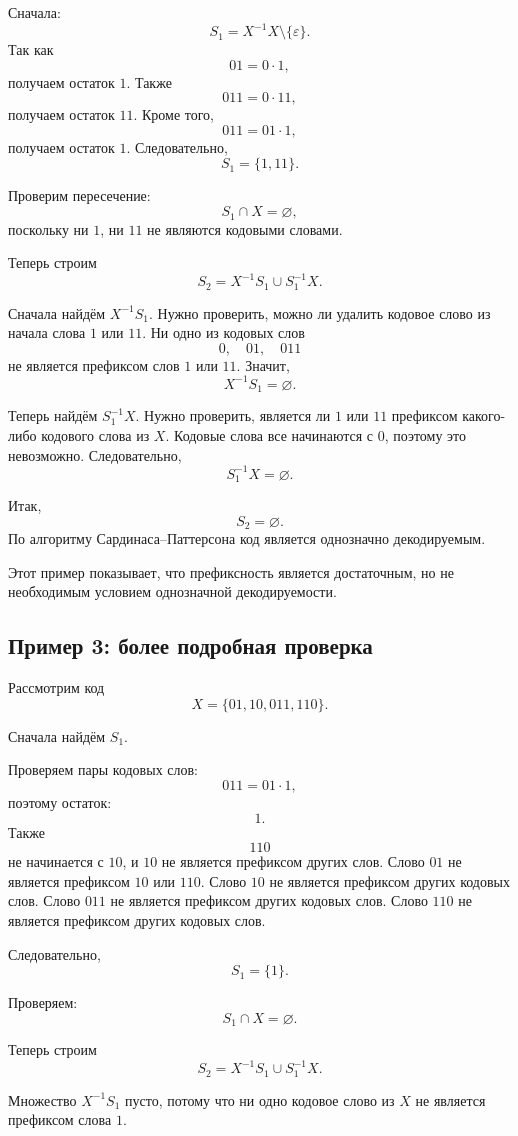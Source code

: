 \documentclass[12pt,a4paper]{article}
\begin{document}
Сначала:
\[
    S_1=X^{-1}X\setminus\{\varepsilon\}.
\]
Так как
\[
    01=0\cdot 1,
\]
получаем остаток $1$.
Также
\[
    011=0\cdot 11,
\]
получаем остаток $11$.
Кроме того,
\[
    011=01\cdot 1,
\]
получаем остаток $1$.
Следовательно,
\[
    S_1=\{1,11\}.
\]

Проверим пересечение:
\[
    S_1\cap X=\varnothing,
\]
поскольку ни $1$, ни $11$ не являются кодовыми словами.

Теперь строим
\[
    S_2=X^{-1}S_1\cup S_1^{-1}X.
\]

Сначала найдём $X^{-1}S_1$.
Нужно проверить, можно ли удалить кодовое слово из начала слова $1$ или $11$.
Ни одно из кодовых слов
\[
    0,\quad 01,\quad 011
\]
не является префиксом слов $1$ или $11$.
Значит,
\[
    X^{-1}S_1=\varnothing.
\]

Теперь найдём $S_1^{-1}X$.
Нужно проверить, является ли $1$ или $11$ префиксом какого-либо кодового слова из $X$.
Кодовые слова все начинаются с $0$, поэтому это невозможно.
Следовательно,
\[
    S_1^{-1}X=\varnothing.
\]

Итак,
\[
    S_2=\varnothing.
\]
По алгоритму Сардинаса--Паттерсона код является однозначно декодируемым.

Этот пример показывает, что префиксность является достаточным, но не необходимым условием однозначной декодируемости.

\subsection{Пример 3: более подробная проверка}

Рассмотрим код
\[
    X=\{01,10,011,110\}.
\]

Сначала найдём $S_1$.

Проверяем пары кодовых слов:
\[
    011 = 01\cdot 1,
\]
поэтому остаток:
\[
    1.
\]
Также
\[
    110
\]
не начинается с $10$, и $10$ не является префиксом других слов.
Слово $01$ не является префиксом $10$ или $110$.
Слово $10$ не является префиксом других кодовых слов.
Слово $011$ не является префиксом других кодовых слов.
Слово $110$ не является префиксом других кодовых слов.

Следовательно,
\[
    S_1=\{1\}.
\]

Проверяем:
\[
    S_1\cap X=\varnothing.
\]

Теперь строим
\[
    S_2=X^{-1}S_1\cup S_1^{-1}X.
\]

Множество $X^{-1}S_1$ пусто, потому что ни одно кодовое слово из $X$ не является префиксом слова $1$.
\end{document}
